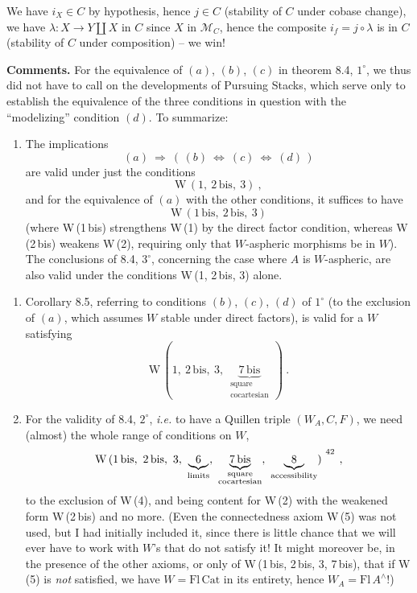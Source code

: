 
We have $i_X \in C$ by hypothesis, hence $j \in C$ (stability of $C$ under cobase change), we have $\lambda : X \longrightarrow Y \amalg X$ in $C$ since $X$ in $\mathcal{M}_C$, hence the composite $i_f = j \circ \lambda$ is in $C$ (stability of $C$ under composition) – we win!

\textbf{Comments.} For the equivalence of $(a)$, $(b)$, $(c)$ in theorem 8.4, $1^\circ$, we thus did not have to call on the developments of Pursuing Stacks, which serve only to establish the equivalence of the three conditions in question with the ``modelizing'' condition $(d)$. To summarize:
\begin{enumerate}[leftmargin=2.5em]
\item[$1^\circ$)] The implications
\[
(a) \ \Longrightarrow\ (\,(b) \ \Longleftrightarrow\ (c) \ \Longleftrightarrow\ (d)\,)
\]
are valid under just the conditions
\[
\mathrm{W}\,(1,\ 2\,\mathrm{bis},\ 3)\ ,
\]
and for the equivalence of $(a)$ with the other conditions, it suffices to have
\[
\mathrm{W}\,(1\,\mathrm{bis},\ 2\,\mathrm{bis},\ 3)
\]
(where W\,(1\,bis) strengthens W\,(1) by the direct factor condition, whereas W\,(2\,bis) weakens W\,(2), requiring only that $W$-aspheric morphisms be in $W$). The conclusions of 8.4, $3^\circ$, concerning the case where $A$ is $W$-aspheric, are also valid under the conditions W\,(1, 2\,bis, 3) alone.
\end{enumerate}


\begin{enumerate}[leftmargin=2.5em]
\item[$2^\circ$)] Corollary 8.5, referring to conditions $(b)$, $(c)$, $(d)$ of $1^\circ$ (to the exclusion of $(a)$, which assumes $W$ stable under direct factors), is valid for a $W$ satisfying
\[
\mathrm{W}\,(1,\ 2\,\mathrm{bis},\ 3,\ \underbrace{7\,\mathrm{bis}}_{\substack{\text{square}\\ \text{cocartesian}}}\,)\ .
\]
\item[$3^\circ$)] For the validity of 8.4, $2^\circ$, \textit{i.e.} to have a Quillen triple $(W_A,C,F)$, we need (almost) the whole range of conditions on $W$,
\[
\mathrm{W}\,(1\,\mathrm{bis},\ 2\,\mathrm{bis},\ 3,\ \underbrace{\ 6\ }_{\text{limits}},\ \underbrace{7\,\mathrm{bis}}_{\substack{\text{square}\\ \text{cocartesian}}},\ \underbrace{\ 8\ }_{\text{accessibility}})\ ^{\footnotemark[42]}\ ,
\]
to the exclusion of W\,(4), and being content for W\,(2) with the weakened form W\,(2\,bis) and no more. (Even the connectedness axiom W\,(5) was not used, but I had initially included it, since there is little chance that we will ever have to work with $W$'s that do not satisfy it! It might moreover be, in the presence of the other axioms, or only of W\,(1\,bis, 2\,bis, 3, 7\,bis), that if W\,(5) is \textit{not} satisfied, we have $W = \mathrm{Fl}\,\mathrm{Cat}$ in its entirety, hence $W_A = \mathrm{Fl}\,A^\wedge$!)
\end{enumerate}

